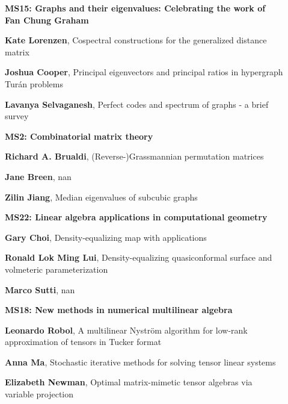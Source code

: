 \documentclass[ILAS2025-program.tex]{subfiles}
\begin{document}
\begin{description}
\begin{description}
    \item[] {\color{mstitle}\textbf{MS15: Graphs and their eigenvalues: Celebrating the work of Fan Chung Graham}} 
    \item[] \textbf{Kate Lorenzen}, Cospectral constructions for the generalized distance matrix
        \item[] \textbf{Joshua Cooper}, Principal eigenvectors and principal ratios in hypergraph Tur\'{a}n problems
        \item[] \textbf{Lavanya Selvaganesh}, Perfect codes and spectrum of graphs - a brief survey

        \end{description}
    \begin{description}
    \item[] {\color{mstitle}\textbf{MS2: Combinatorial matrix theory}} 
    \item[] \textbf{Richard A. Brualdi}, (Reverse-)Grassmannian permutation matrices
        \item[] \textbf{Jane Breen}, nan
        \item[] \textbf{Zilin Jiang}, Median eigenvalues of subcubic graphs
        \end{description}
    \begin{description}
    \item[] {\color{mstitle}\textbf{MS22: Linear algebra applications in computational geometry}} 
    \item[] \textbf{Gary Choi}, Density-equalizing map with applications
        \item[] \textbf{Ronald Lok Ming Lui}, Density-equalizing quasiconformal surface and volmeteric parameterization
        \item[] \textbf{Marco Sutti}, nan
        \end{description}
    \begin{description}
    \item[] {\color{mstitle}\textbf{MS18: New methods in numerical multilinear algebra}} 
    \item[] \textbf{Leonardo Robol}, A multilinear Nyström algorithm for low-rank approximation of tensors in Tucker format
        \item[] \textbf{Anna Ma}, Stochastic iterative methods for solving tensor linear systems
        \item[] \textbf{Elizabeth Newman}, Optimal matrix-mimetic tensor algebras via variable projection


\end{description}
\end{description}
\end{document}
